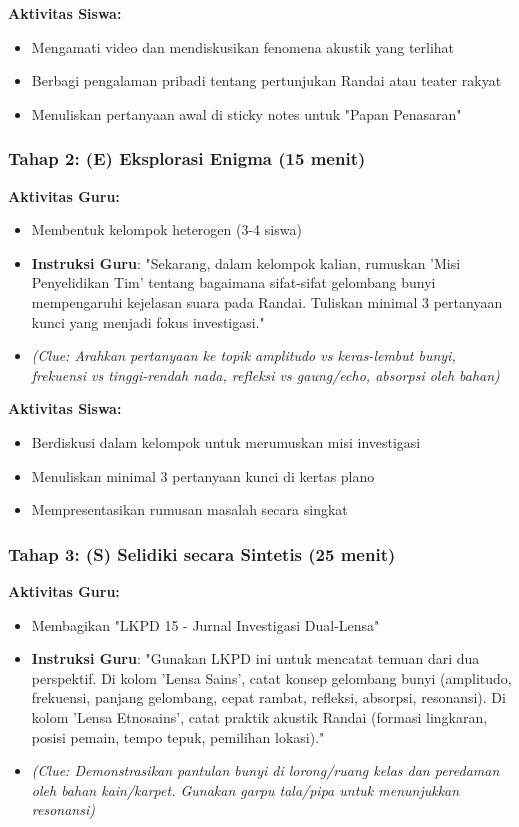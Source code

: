 \documentclass[12pt,a4paper]{article}
\begin{document}
\textbf{Aktivitas Siswa:}
\begin{itemize}
\item Mengamati video dan mendiskusikan fenomena akustik yang terlihat
\item Berbagi pengalaman pribadi tentang pertunjukan Randai atau teater rakyat
\item Menuliskan pertanyaan awal di sticky notes untuk "Papan Penasaran"
\end{itemize}

\subsubsection{Tahap 2: (E) Eksplorasi Enigma (15 menit)}

\textbf{Aktivitas Guru:}
\begin{itemize}
\item Membentuk kelompok heterogen (3-4 siswa)
\item \textbf{Instruksi Guru}: "Sekarang, dalam kelompok kalian, rumuskan 'Misi Penyelidikan Tim' tentang bagaimana sifat-sifat gelombang bunyi mempengaruhi kejelasan suara pada Randai. Tuliskan minimal 3 pertanyaan kunci yang menjadi fokus investigasi."
\item \textit{(Clue: Arahkan pertanyaan ke topik amplitudo vs keras-lembut bunyi, frekuensi vs tinggi-rendah nada, refleksi vs gaung/echo, absorpsi oleh bahan)}
\end{itemize}

\textbf{Aktivitas Siswa:}
\begin{itemize}
\item Berdiskusi dalam kelompok untuk merumuskan misi investigasi
\item Menuliskan minimal 3 pertanyaan kunci di kertas plano
\item Mempresentasikan rumusan masalah secara singkat
\end{itemize}

\subsubsection{Tahap 3: (S) Selidiki secara Sintetis (25 menit)}

\textbf{Aktivitas Guru:}
\begin{itemize}
\item Membagikan "LKPD 15 - Jurnal Investigasi Dual-Lensa"
\item \textbf{Instruksi Guru}: "Gunakan LKPD ini untuk mencatat temuan dari dua perspektif. Di kolom 'Lensa Sains', catat konsep gelombang bunyi (amplitudo, frekuensi, panjang gelombang, cepat rambat, refleksi, absorpsi, resonansi). Di kolom 'Lensa Etnosains', catat praktik akustik Randai (formasi lingkaran, posisi pemain, tempo tepuk, pemilihan lokasi)."
\item \textit{(Clue: Demonstrasikan pantulan bunyi di lorong/ruang kelas dan peredaman oleh bahan kain/karpet. Gunakan garpu tala/pipa untuk menunjukkan resonansi)}
\end{itemize}
\end{document}
